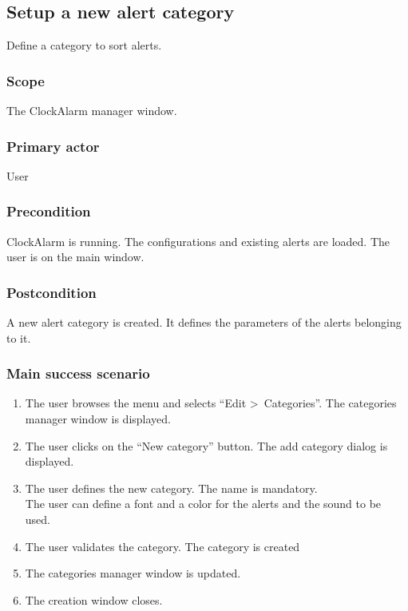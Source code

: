 \subsection{Setup a new alert category}
Define a category to sort alerts.
\subsubsection{Scope}
The ClockAlarm manager window.
\subsubsection{Primary actor}
User
\subsubsection{Precondition}
ClockAlarm is running. The configurations and existing alerts are loaded. The user is on the main window.
\subsubsection{Postcondition}
A new alert category is created. It defines the parameters of the alerts belonging to it.
\subsubsection{Main success scenario}
\begin{enumerate}
	\item The user browses the menu and selects ``Edit \textgreater~Categories''. The categories manager window is displayed.
	\item The user clicks on the ``New category'' button. The add category dialog is displayed.
	\item\label{itm:ucca_enter_sc}The user defines the new category. The name is mandatory. \\The user can define a font and a color for the alerts and the sound to be used.
	\item\label{itm:ucca_validate_sc} The user validates the category. The category is created
	\item The categories manager window is updated.
	\item The creation window closes.
\end{enumerate}
